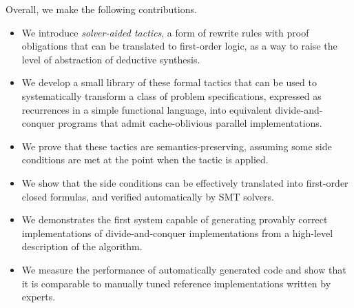 Overall, we make the following contributions.
\begin{itemize}
\item We introduce \emph{solver-aided tactics}, a form of rewrite rules with proof obligations that can be translated to first-order logic,
  as a way to raise the level of abstraction of deductive synthesis.
\item We develop a small library of these formal tactics that can be used to 
  systematically transform a class of problem specifications,
  expressed as recurrences in a simple functional language,
  into equivalent divide-and-conquer programs that admit cache-oblivious parallel
  implementations.
\item We prove that these tactics are semantics-preserving, assuming some side conditions are met
  at the point when the tactic is applied.
\item We show that the side conditions can be effectively translated into first-order closed
  formulas, and verified automatically by SMT solvers.
\item We demonstrates the first system capable of generating provably correct implementations of divide-and-conquer implementations from a high-level description of the algorithm. 
\item We measure the performance of automatically generated code and show that it is comparable to manually tuned reference implementations written by experts.
\end{itemize}
